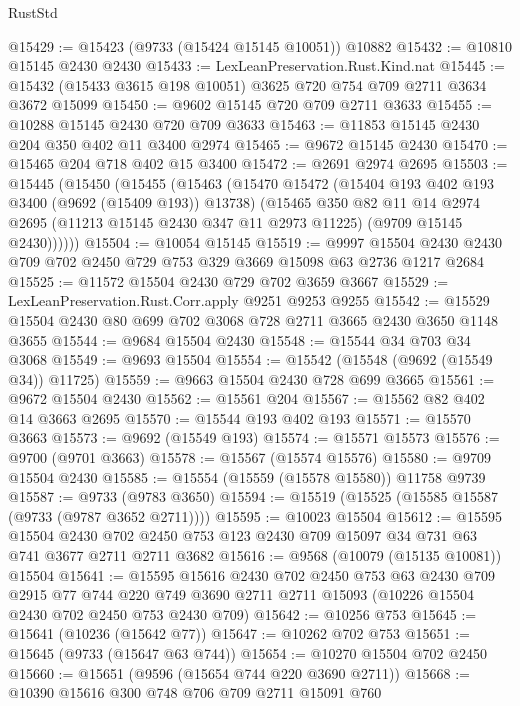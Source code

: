 \begin{lexlean}{RustStd}
\begin{coremodule}
@15429 := @15423 (@9733 (@15424 @15145 @10051)) @10882
@15432 := @10810 @15145 @2430 @2430
@15433 := LexLeanPreservation.Rust.Kind.nat
@15445 := @15432 (@15433 @3615 @198 @10051) @3625 @720 @754 @709 @2711 @3634 @3672 @15099
@15450 := @9602 @15145 @720 @709 @2711 @3633
@15455 := @10288 @15145 @2430 @720 @709 @3633
@15463 := @11853 @15145 @2430 @204 @350 @402 @11 @3400 @2974
@15465 := @9672 @15145 @2430
@15470 := @15465 @204 @718 @402 @15 @3400
@15472 := @2691 @2974 @2695
@15503 := @15445
    (@15450
      (@15455
        (@15463
          (@15470
            @15472
            (@15404 @193 @402 @193 @3400 (@9692 (@15409 @193)) @13738)
            (@15465
              @350
              @82
              @11
              @14
              @2974
              @2695
              (@11213 @15145 @2430 @347 @11 @2973 @11225)
              (@9709 @15145 @2430))))))
@15504 := @10054 @15145
@15519 := @9997 @15504 @2430 @2430 @709 @702 @2450 @729 @753 @329 @3669 @15098 @63 @2736 @1217 @2684
@15525 := @11572 @15504 @2430 @729 @702 @3659 @3667
@15529 := LexLeanPreservation.Rust.Corr.apply @9251 @9253 @9255
@15542 := @15529 @15504 @2430 @80 @699 @702 @3068 @728 @2711 @3665 @2430 @3650 @1148 @3655
@15544 := @9684 @15504 @2430
@15548 := @15544 @34 @703 @34 @3068
@15549 := @9693 @15504
@15554 := @15542 (@15548 (@9692 (@15549 @34)) @11725)
@15559 := @9663 @15504 @2430 @728 @699 @3665
@15561 := @9672 @15504 @2430
@15562 := @15561 @204
@15567 := @15562 @82 @402 @14 @3663 @2695
@15570 := @15544 @193 @402 @193
@15571 := @15570 @3663
@15573 := @9692 (@15549 @193)
@15574 := @15571 @15573
@15576 := @9700 (@9701 @3663)
@15578 := @15567 (@15574 @15576)
@15580 := @9709 @15504 @2430
@15585 := @15554 (@15559 (@15578 @15580)) @11758 @9739
@15587 := @9733 (@9783 @3650)
@15594 := @15519 (@15525 (@15585 @15587 (@9733 (@9787 @3652 @2711))))
@15595 := @10023 @15504
@15612 := @15595
    @15504
    @2430
    @702
    @2450
    @753
    @123
    @2430
    @709
    @15097
    @34
    @731
    @63
    @741
    @3677
    @2711
    @2711
    @3682
@15616 := @9568 (@10079 (@15135 @10081)) @15504
@15641 := @15595
    @15616
    @2430
    @702
    @2450
    @753
    @63
    @2430
    @709
    @2915
    @77
    @744
    @220
    @749
    @3690
    @2711
    @2711
    @15093
    (@10226 @15504 @2430 @702 @2450 @753 @2430 @709)
@15642 := @10256 @753
@15645 := @15641 (@10236 (@15642 @77))
@15647 := @10262 @702 @753
@15651 := @15645 (@9733 (@15647 @63 @744))
@15654 := @10270 @15504 @702 @2450
@15660 := @15651 (@9596 (@15654 @744 @220 @3690 @2711))
@15668 := @10390 @15616 @300 @748 @706 @709 @2711 @15091 @760

\end{coremodule}
\end{lexlean}
